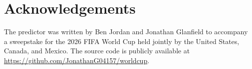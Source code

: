 \documentclass[12pt,a4paper]{article}
\begin{document}
\section*{Acknowledgements}

The predictor was written by Ben Jordan and Jonathan Glanfield to
accompany a sweepstake for the 2026 FIFA World Cup held jointly by
the United States, Canada, and Mexico.  The source code is publicly
available at
\url{https://github.com/JonathanG04157/worldcup}.
\end{document}
